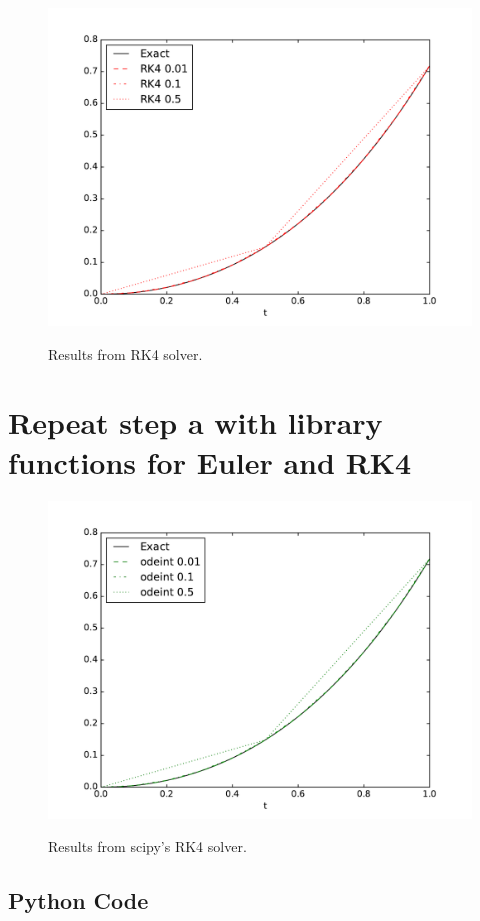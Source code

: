 \documentclass[onecolumn,10pt]{jhwhw}
\begin{document}
\begin{figure}[h!]
\begin{center}
\includegraphics[height=0.4\textheight]{rk4.pdf}
\label{fig:on}
\end{center}
\caption{Results from RK4 solver.}
\end{figure}

\part{Repeat step a with library functions for Euler and RK4}
\begin{figure}[h!]
\begin{center}
\includegraphics[height=0.4\textheight]{odeint.pdf}
\label{fig:on}
\end{center}
\caption{Results from scipy's RK4 solver.}
\end{figure}

\clearpage
\appendix
\chapter{Python Code}

\end{document}

